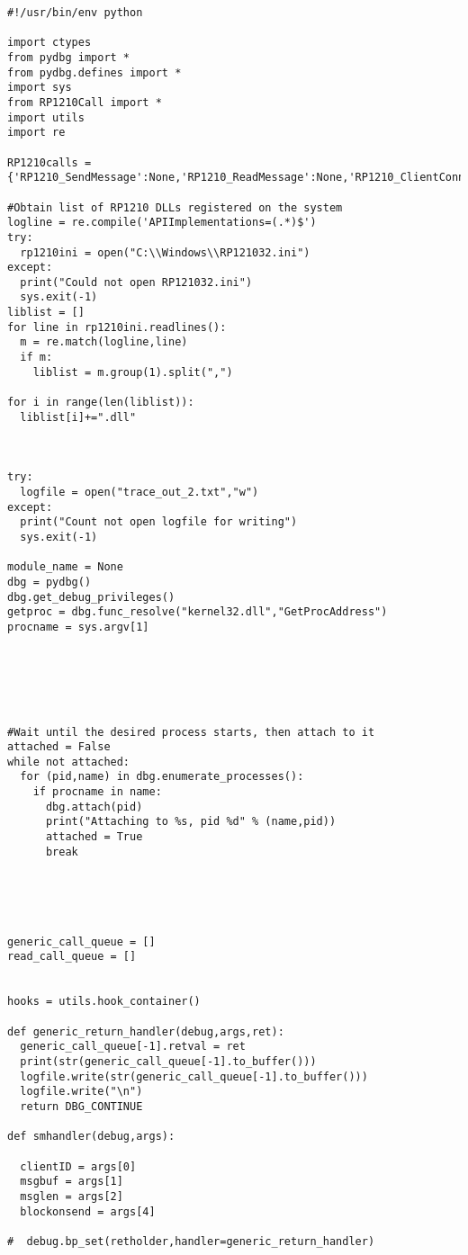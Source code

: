 \label{app:trace}
\begin{verbatim}
#!/usr/bin/env python

import ctypes
from pydbg import *
from pydbg.defines import *
import sys
from RP1210Call import *
import utils
import re

RP1210calls = {'RP1210_SendMessage':None,'RP1210_ReadMessage':None,'RP1210_ClientConnect':None,'RP1210_ClientDisconnect':None,'RP1210_SendCommand':None}

#Obtain list of RP1210 DLLs registered on the system
logline = re.compile('APIImplementations=(.*)$')
try:
  rp1210ini = open("C:\\Windows\\RP121032.ini")
except:
  print("Could not open RP121032.ini")
  sys.exit(-1)
liblist = []
for line in rp1210ini.readlines():
  m = re.match(logline,line)
  if m:
    liblist = m.group(1).split(",")

for i in range(len(liblist)):
  liblist[i]+=".dll"



try:
  logfile = open("trace_out_2.txt","w")
except:
  print("Count not open logfile for writing")
  sys.exit(-1)

module_name = None
dbg = pydbg()
dbg.get_debug_privileges()
getproc = dbg.func_resolve("kernel32.dll","GetProcAddress")
procname = sys.argv[1]






#Wait until the desired process starts, then attach to it
attached = False
while not attached:
  for (pid,name) in dbg.enumerate_processes():
    if procname in name:
      dbg.attach(pid)
      print("Attaching to %s, pid %d" % (name,pid))
      attached = True
      break





generic_call_queue = []
read_call_queue = []


hooks = utils.hook_container()

def generic_return_handler(debug,args,ret):
  generic_call_queue[-1].retval = ret
  print(str(generic_call_queue[-1].to_buffer()))
  logfile.write(str(generic_call_queue[-1].to_buffer()))
  logfile.write("\n")
  return DBG_CONTINUE

def smhandler(debug,args):

  clientID = args[0]
  msgbuf = args[1]
  msglen = args[2]
  blockonsend = args[4]

#  debug.bp_set(retholder,handler=generic_return_handler)



\end{verbatim}
